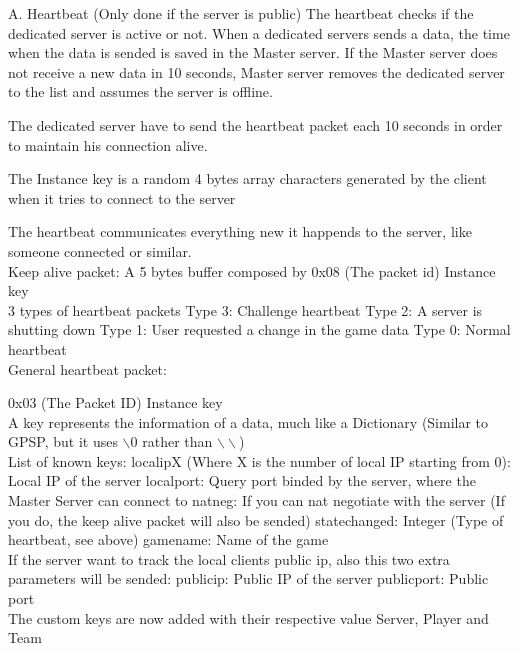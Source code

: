 \documentclass[oneside,titlepage,a4paper]{Definition/retrospy} %
\begin{document}
A. Heartbeat (Only done if the server is public)
The heartbeat checks if the dedicated server is active or not.
When a dedicated servers sends a data, the time when the data is sended is saved in the Master server.
If the Master server does not receive a new data in 10 seconds, Master server removes the dedicated server
to the list and assumes the server is offline.

The dedicated server have to send the heartbeat packet each 10 seconds in order to maintain his connection
alive.

The Instance key is a random 4 bytes array characters generated by the client when it tries
to connect to the server

The heartbeat communicates everything new it happends to the server, like someone connected or similar.
\\
Keep alive packet:
A 5 bytes buffer composed by
0x08 (The packet id)
Instance key
\\
3 types of heartbeat packets
Type 3: Challenge heartbeat
Type 2: A server is shutting down
Type 1: User requested a change in the game data
Type 0: Normal heartbeat
\\
General heartbeat packet:

0x03 (The Packet ID)
Instance key
\\
A key represents the information of a data, much like a Dictionary (Similar to GPSP, but it uses $\backslash$0 rather than $\backslash\backslash$) 
\\
List of known keys:
localipX (Where X is the number of local IP starting from 0): Local IP of the server
localport: Query port binded by the server, where the Master Server can connect to
natneg: If you can nat negotiate with the server (If you do, the keep alive packet will also be sended)
statechanged: Integer (Type of heartbeat, see above)
gamename: Name of the game
\\
If the server want to track the local clients public ip, also this two extra parameters will be sended:
publicip: Public IP of the server
publicport: Public port
\\
The custom keys are now added with their respective value
Server, Player and Team
\\
\end{document}
